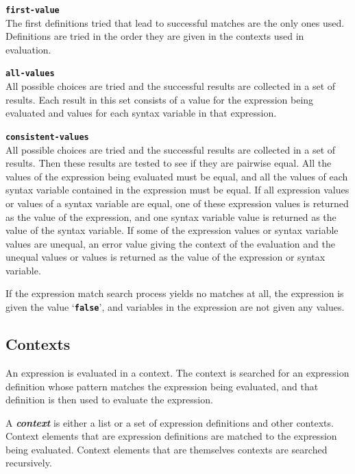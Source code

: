 \documentclass[12pt]{article}
\makeatletter
\newcommand{\TT}[1]{{\tt \bfseries #1}}
\newcommand{\key}[1]{{\bf \em #1}\index{#1}}
\newcommand{\ttkey}[1]{\TT{#1}\index{#1@{\tt #1}}}
\makeatother
\begin{document}
\begin{list}{}{}

\item[\ttkey{first-value}]~\\
The first definitions tried that lead to successful matches are the only ones
used.  Definitions are tried in the order they are given in the contexts
used in evaluation.

\item[\ttkey{all-values}]~\\
All possible choices are tried and the
successful results are collected in a set of results.  Each result
in this set consists of a value for the expression being evaluated
and values for each syntax variable in that expression.

\item[\ttkey{consistent-values}]~\\
All possible choices are tried and the
successful results are collected in a set of results.  Then these results
are tested to see if they are pairwise equal.
All the values of the expression
being evaluated must be equal, and all the values of each syntax variable
contained in the expression must be equal.  If all expression values or
values of a syntax variable are equal, one of these expression values
is returned as the value of the expression, and one syntax variable value
is returned as the value of the syntax variable.
If some of the expression values or syntax variable values are unequal, an
error value giving the context of the evaluation and the unequal values
or values is returned as the value of the expression or syntax variable.

\end{list}

If the expression match search process yields no matches at all,
the expression is given the value `\TT{false}', and variables in the
expression are not given any values.

\subsection{Contexts}
\label{CONTEXTS}

An expression is evaluated in a context.  The context is searched
for an expression definition whose pattern matches the expression being
evaluated, and that definition is then used to evaluate the expression.

A \key{context} is either a list or a set of expression definitions and
other contexts.  Context elements that are expression definitions are
matched to the expression being evaluated.  Context elements that are
themselves contexts are searched recursively.
\end{document}
